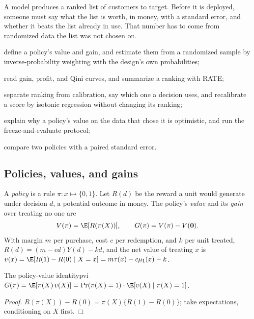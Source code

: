 \documentclass[11pt]{article}
\begin{document}

\begin{decision}
A model produces a ranked list of customers to target. Before it is deployed, someone must say what the list is
worth, in money, with a standard error, and whether it beats the list already in use. That number has to
come from randomized data the list was not chosen on.
\end{decision}

\begin{goals}
  \item define a policy's value and gain, and estimate them from a randomized sample by inverse-probability
  weighting with the design's own probabilities;
  \item read gain, profit, and Qini curves, and summarize a ranking with RATE;
  \item separate ranking from calibration, say which one a decision uses, and recalibrate a score by isotonic
  regression without changing its ranking;
  \item explain why a policy's value on the data that chose it is optimistic, and run the freeze-and-evaluate
  protocol;
  \item compare two policies with a paired standard error.
\end{goals}

\sectionone

\subsection{Policies, values, and gains}

A \emph{policy} is a rule $\pi: x \mapsto \{0,1\}$. Let $R(d)$ be the reward a unit would generate under decision $d$, a
potential outcome in money. The policy's \emph{value} and its \emph{gain} over treating no one are
\[
  V(\pi) = \E[R(\pi(X))], \qquad G(\pi) = V(\pi) - V(\mathbf{0}) .
\]
With margin $m$ per purchase, cost $c$ per redemption, and $k$ per unit treated, $R(d) = (m - cd)Y(d) - kd$, and
the net value of treating $x$ is $v(x) = \E[R(1) - R(0) \mid X = x] = m\tau(x) - c\mu_1(x) - k$.

\begin{prop}{The policy-value identity}{pvi}
$G(\pi) = \E[\pi(X)\,v(X)] = \Pr(\pi(X) = 1)\cdot\E[v(X) \mid \pi(X) = 1]$.
\end{prop}
\begin{proof}
$R(\pi(X)) - R(0) = \pi(X)\{R(1) - R(0)\}$; take expectations, conditioning on $X$ first.
\end{proof}
\end{document}
